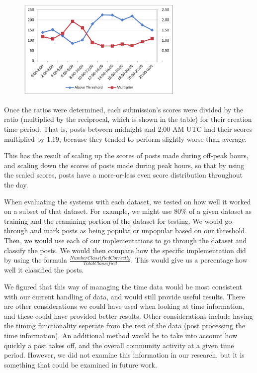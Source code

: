 \documentclass{acm_proc_article-sp}
\begin{document}
\begin{figure}[h!]
\includegraphics[width=8cm]{timeweightinggraph.pdf}
\end{figure}

Once the ratios were determined, each submission's scores were divided by the ratio (multiplied by the reciprocal, which is shown in the
table) for their creation time period.  That is, posts between midnight and 2:00 AM UTC had their scores multiplied by 1.19, because they
tended to perform slightly worse than average.

This has the result of scaling up the scores of posts made during off-peak hours, and scaling down the scores of posts made during peak
hours, so that by using the scaled scores, posts have a more-or-less even score distribution throughout the day.

When evaluating the systems with each dataset, we tested on how well it worked on a subset of that dataset. For example, we might use 80\% of a given dataset as training and the reamining portion of the dataset for testing. We would go through and mark posts as being popular or unpopular based on our threshold. Then, we would use each of our implementations to go through the dataset and classify the posts. We would then compare how the specific implementation did by using the formula $\frac{Number Classified Correctly}{Total Classified}$. This would give us a percentage how well it classified the posts. 

We figured that this way of managing the time data would be most consistent with our current handling of data, and would still provide useful results. There are other considerations we could have used when looking at time information, and these could have provided better results. Other considerations include having the timing functionality seperate from the rest of the data (post processing the time information). An additional method would be to take into account how quickly a post takes off, and the overall community activity at a given time period. However, we did not examine this information in our research, but it is something that could be examined in future work.
\end{document}
